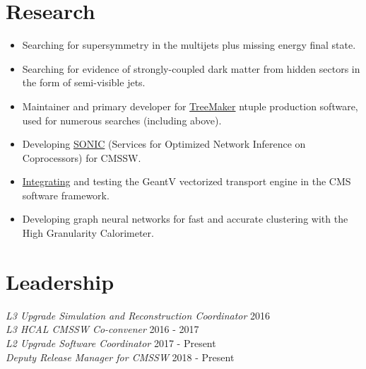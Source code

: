 \section{Research}
\begin{itemize}[leftmargin=12pt]
\item Searching for supersymmetry in the multijets plus missing energy final state.
\item Searching for evidence of strongly-coupled dark matter from hidden sectors in the form of semi-visible jets.
\item Maintainer and primary developer for \href{https://github.com/TreeMaker/TreeMaker}{TreeMaker} ntuple production software, used for numerous searches (including above).
\item Developing \href{https://github.com/hls-fpga-machine-learning/SonicCMS/}{SONIC} (Services for Optimized Network Inference on Coprocessors) for CMSSW.
\item \href{https://github.com/kpedro88/SimGVCore}{Integrating} and testing the GeantV vectorized transport engine in the CMS software framework.
\item Developing graph neural networks for fast and accurate clustering with the High Granularity Calorimeter.
\end{itemize}

\section{Leadership}
{\sl L3 Upgrade Simulation and Reconstruction Coordinator} \hfill 2016\\
{\sl L3 HCAL CMSSW Co-convener} \hfill 2016 - 2017\\
{\sl L2 Upgrade Software Coordinator} \hfill 2017 - Present\\
{\sl Deputy Release Manager for CMSSW} \hfill 2018 - Present%
